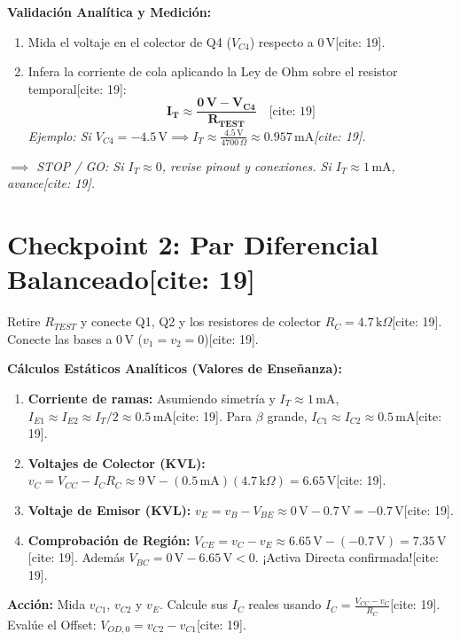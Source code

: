 \documentclass[11pt, a4paper]{article}
\begin{document}
\textbf{Validación Analítica y Medición:}
\begin{enumerate}
    \item Mida el voltaje en el colector de Q4 ($V_{C4}$) respecto a $0\,\text{V}$[cite: 19].
    \item Infera la corriente de cola aplicando la Ley de Ohm sobre el resistor temporal[cite: 19]:
    \begin{equation*}
        \mathbf{I_T \approx \frac{0\,\text{V} - V_{C4}}{R_{TEST}}} \quad \text{[cite: 19]}
    \end{equation*}
    \textit{Ejemplo: Si $V_{C4} = -4.5\,\text{V} \implies I_T \approx \frac{4.5\,\text{V}}{4700\,\Omega} \approx 0.957\,\text{mA}$[cite: 19].}
\end{enumerate}
\textit{$\implies$ STOP / GO: Si $I_T \approx 0$, revise pinout y conexiones. Si $I_T \approx 1\,\text{mA}$, avance[cite: 19].}

\section*{Checkpoint 2: Par Diferencial Balanceado[cite: 19]}
Retire $R_{TEST}$ y conecte Q1, Q2 y los resistores de colector $R_C = 4.7\,\text{k}\Omega$[cite: 19]. Conecte las bases a $0\,\text{V}$ ($v_1 = v_2 = 0$)[cite: 19].

\textbf{Cálculos Estáticos Analíticos (Valores de Enseñanza):}
\begin{enumerate}
    \item \textbf{Corriente de ramas:} Asumiendo simetría y $I_T \approx 1\,\text{mA}$, $I_{E1} \approx I_{E2} \approx I_T/2 \approx 0.5\,\text{mA}$[cite: 19]. Para $\beta$ grande, $I_{C1} \approx I_{C2} \approx 0.5\,\text{mA}$[cite: 19].
    \item \textbf{Voltajes de Colector (KVL):} $v_C = V_{CC} - I_C R_C \approx 9\,\text{V} - (0.5\,\text{mA})(4.7\,\text{k}\Omega) = 6.65\,\text{V}$[cite: 19].
    \item \textbf{Voltaje de Emisor (KVL):} $v_E = v_B - V_{BE} \approx 0\,\text{V} - 0.7\,\text{V} = -0.7\,\text{V}$[cite: 19].
    \item \textbf{Comprobación de Región:} $V_{CE} = v_C - v_E \approx 6.65\,\text{V} - (-0.7\,\text{V}) = 7.35\,\text{V}$[cite: 19]. Además $V_{BC} = 0\,\text{V} - 6.65\,\text{V} < 0$. ¡Activa Directa confirmada![cite: 19].
\end{enumerate}
\textbf{Acción:} Mida $v_{C1}$, $v_{C2}$ y $v_E$. Calcule sus $I_C$ reales usando $I_C = \frac{V_{CC}-v_C}{R_C}$[cite: 19]. Evalúe el Offset: $V_{OD,0} = v_{C2} - v_{C1}$[cite: 19].
\end{document}
